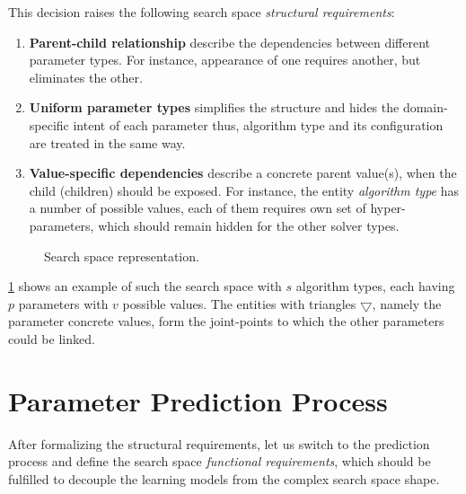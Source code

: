This decision raises the following search space \emph{structural requirements}:
\begin{enumerate}
	\item[S.R.1] \textbf{Parent-child relationship} describe the dependencies between different parameter types. For instance, appearance of one requires another, but eliminates the other.

	\item[S.R.2] \textbf{Uniform parameter types} simplifies the structure and hides the domain-specific intent of each parameter thus, algorithm type and its configuration are treated in the same way.

	\item[S.R.3] \textbf{Value-specific dependencies} describe a concrete parent value(s), when the child (children) should be exposed. For instance, the entity \textit{algorithm type} has a number of possible values, each of them requires own set of hyper-parameters, which should remain hidden for the other solver types.
\end{enumerate}

\begin{figure}
	\centering
	
	\caption{Search space representation.}
	\label{concept:pict:Search Space Representation}
\end{figure}

\cref{concept:pict:Search Space Representation} shows an example of such the search space with $s$ algorithm types, each having $p$ parameters with $v$ possible values. The entities with triangles $\bigtriangledown$, namely the parameter concrete values, form the joint-points to which the other parameters could be linked. 


\section{Parameter Prediction Process}\label{concept:prediction}

After formalizing the structural requirements, let us switch to the prediction process and define the search space \emph{functional requirements}, which should be fulfilled to decouple the learning models from the complex search space shape.

